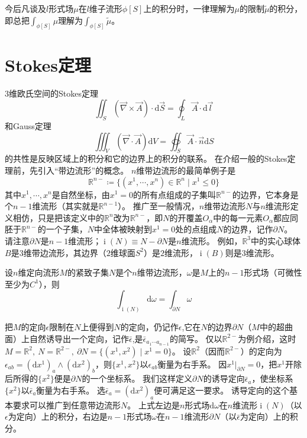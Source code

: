 今后凡谈及$l$形式场$\mu$在$l$维子流形$\phi[S]$上的积分时，一律理解为$\mu$的限制$\tilde\mu$的积分，即总把$\displaystyle\int_{\phi[S]}\mu$理解为$\displaystyle\int_{\phi[S]}\tilde\mu$。

\section{Stokes定理}

$3$维欧氏空间的Stokes定理
$$\iint_S(\vec\nabla \times \vec{A})\cdot\mathrm{d}\vec{S} = \oint_L\vec{A}\cdot\mathrm{d}\vec{l}$$
和Gauss定理
$$\iiint_V(\vec\nabla\cdot\vec{A})\mathrm{d}V = \oiint_S\vec{A}\cdot\vec{n}\mathrm{d}S$$
的共性是反映区域上的积分和它的边界上的积分的联系。
在介绍一般的Stokes定理前，先引入``带边流形''的概念。
$n$维带边流形的最简单例子是
$$\mathbb{R}^{n-} \coloneq \{(x^1, \cdots, x^n) \in \mathbb{R}^n \mid x^1 \leq 0\}$$
其中$x^1, \cdots, x^n$是自然坐标，由$x^1 = 0$的所有点组成的子集叫$\mathbb{R}^{n-}$的边界，它本身是个$n - 1$维流形（其实就是$\mathbb{R}^{n - 1}$）。
推广至一般情况，$n$维带边流形$N$与$n$维流形定义相仿，只是把该定义中的$\mathbb{R}^n$改为$\mathbb{R}^{n-}$，即$N$的开覆盖${O_\alpha}$中的每一元素$O_\alpha$都应同胚于$\mathbb{R}^{n-}$的一个子集，$N$中全体被映射到$x^1 = 0$处的点组成$N$的边界，记作$\partial N$。
请注意$\partial N$是$n - 1$维流形；$\operatorname{i}(N) \equiv N - \partial N$是$n$维流形。
例如，$\mathbb{R}^3$中的实心球体$B$是$3$维带边流形，其边界（$2$维球面$S^2$）是$2$维流形，$\operatorname{i}(B)$则是$3$维流形。

\begin{theorem}
    设$n$维定向流形$M$的紧致子集$N$是个$n$维带边流形，$\omega$是$M$上的$n - 1$形式场（可微性至少为$C^1$），则
    $$\int_{\operatorname{i}(N)}\mathrm{d}\omega = \int_{\partial N}\omega$$
\end{theorem}

\begin{note}
    把$M$的定向$\epsilon$限制在$N$上便得到$N$的定向，仍记作$\epsilon$,它在$N$的边界$\partial N$（$M$中的超曲面）上自然诱导出一个定向，记作$\bar\epsilon$,是$\bar\epsilon_{a_1 \cdots a_{n - 1}}$的简写。
    仅以$\mathbb{R}^{2-}$为例介绍，这时$M = \mathbb{R}^2, ~ N = \mathbb{R}^{2-}, ~ \partial N = \{(x^1, x^2) \mid x^1 = 0\}$。
    设$\mathbb{R}^2$（因而$\mathbb{R}^{2-}$）的定向为$\epsilon_{ab} = (\mathrm{d}x^1)_a \wedge (\mathrm{d}x^2)_b$，则$\{x^1, x^2\}$以$\epsilon_{ab}$衡量为右手系。
    因$x^1|_{\partial N} = 0$，把$x^1$开除后所得的$\{x^2\}$便是$\partial N$的一个坐标系。
    我们这样定义$\partial N$的诱导定向$\bar\epsilon_a$，使坐标系$\{x^2\}$以$\bar\epsilon_a$衡量为右手系。
    选$\bar\epsilon_a = (\mathrm{d}x^2)_a$便可满足这一要求。
    诱导定向的这个基本要求可以推广到任意带边流形$N$。
    上式左边是$n$形式场$\mathrm{d}\omega$在$n$维流形$\operatorname{i}(N)$（以$\epsilon$为定向）上的积分，右边是$n - 1$形式场$\omega$在$n - 1$维流形$\partial N$（以$\bar\epsilon$为定向）上的积分。
\end{note}

